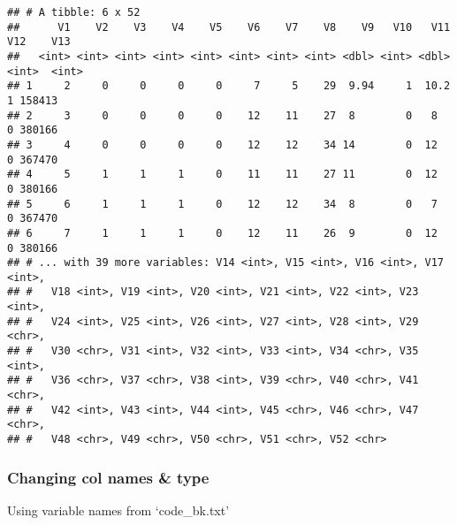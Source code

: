 \documentclass[
]{article}
\begin{document}
\begin{verbatim}
## # A tibble: 6 x 52
##      V1    V2    V3    V4    V5    V6    V7    V8    V9   V10   V11   V12    V13
##   <int> <int> <int> <int> <int> <int> <int> <int> <dbl> <int> <dbl> <int>  <int>
## 1     2     0     0     0     0     7     5    29  9.94     1  10.2     1 158413
## 2     3     0     0     0     0    12    11    27  8        0   8       0 380166
## 3     4     0     0     0     0    12    12    34 14        0  12       0 367470
## 4     5     1     1     1     0    11    11    27 11        0  12       0 380166
## 5     6     1     1     1     0    12    12    34  8        0   7       0 367470
## 6     7     1     1     1     0    12    11    26  9        0  12       0 380166
## # ... with 39 more variables: V14 <int>, V15 <int>, V16 <int>, V17 <int>,
## #   V18 <int>, V19 <int>, V20 <int>, V21 <int>, V22 <int>, V23 <int>,
## #   V24 <int>, V25 <int>, V26 <int>, V27 <int>, V28 <int>, V29 <chr>,
## #   V30 <chr>, V31 <int>, V32 <int>, V33 <int>, V34 <chr>, V35 <int>,
## #   V36 <chr>, V37 <chr>, V38 <int>, V39 <chr>, V40 <chr>, V41 <chr>,
## #   V42 <int>, V43 <int>, V44 <int>, V45 <chr>, V46 <chr>, V47 <chr>,
## #   V48 <chr>, V49 <chr>, V50 <chr>, V51 <chr>, V52 <chr>
\end{verbatim}

\hypertarget{changing-col-names-type}{%
\subsubsection{Changing col names \&
type}\label{changing-col-names-type}}

Using variable names from `code\_bk.txt'
\end{document}

